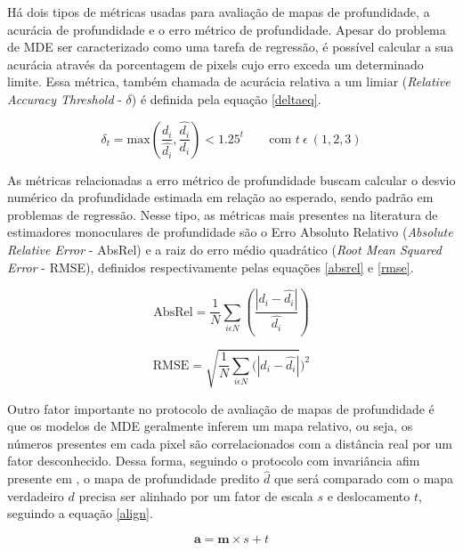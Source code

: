 Há dois tipos de métricas usadas para avaliação de mapas de profundidade, a acurácia de profundidade e o erro métrico de profundidade. Apesar do problema de MDE ser caracterizado como uma tarefa de regressão, é possível calcular a sua acurácia através da porcentagem de pixels cujo erro exceda um determinado limite. Essa métrica, também chamada de acurácia relativa a um limiar (\textit{Relative Accuracy Threshold} - $\delta$) é definida pela equação \ref{deltaeq}.

\begin{equation}
    \delta_t = \text{max}\left( \frac{d_i}{\hat{d_i}}, \frac{\hat{d_i}}{d_i} \right) < 1.25^t \qquad \text{com } t \> \epsilon \> (1,2,3)
    \label{deltaeq}
\end{equation}

As métricas relacionadas a erro métrico de profundidade buscam calcular o desvio numérico da profundidade estimada em relação ao esperado, sendo padrão em problemas de regressão. Nesse tipo, as métricas mais presentes na literatura de estimadores monoculares de profundidade são o Erro Absoluto Relativo (\textit{Absolute Relative Error} - AbsRel) e a raiz do erro médio quadrático (\textit{Root Mean Squared Error} - RMSE), definidos respectivamente pelas equações \ref{absrel} e \ref{rmse}.


\begin{equation}
    \text{AbsRel} =\frac{1}{N} \sum_{i \epsilon N} (\frac{\left| d_i - \hat{d_i} \right|}{\hat{d_i}})
 \label{absrel}
\end{equation}

\begin{equation}
    \text{RMSE} = \sqrt{\frac{1}{N} \sum_{i \epsilon N} (\left| d_i - \hat{d_i} \right|})^2
 \label{rmse}
\end{equation}

Outro fator importante no protocolo de avaliação de mapas de profundidade é que os modelos de MDE geralmente inferem um mapa relativo, ou seja, os números presentes em cada pixel são correlacionados com a distância real por um fator desconhecido. Dessa forma, seguindo o protocolo com invariância afim presente em \cite{ke2024repurposing}, o mapa de profundidade predito $\hat{d}$ que será comparado com o mapa verdadeiro $d$ precisa ser alinhado por um fator de escala $s$ e deslocamento $t$, seguindo a equação \ref{align}.

\begin{equation}
    \textbf{a} = \textbf{m} \times s + t
    \label{align}
\end{equation}

